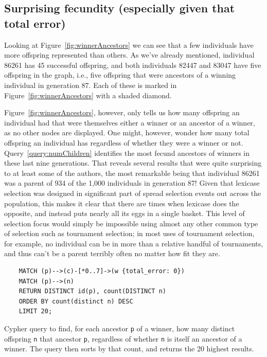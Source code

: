 \subsection{Surprising fecundity (especially given that total error)}
\label{sec:surprisingFecundity}

Looking at Figure~\ref{fig:winnerAncestors} we can see that a few individuals have more offspring
represented than others. As we've already mentioned, individual 86261 has 45 successful offspring,
and both individuals 82447 and 83047 have five offspring in the graph, i.e., five offspring that were
ancestors of a winning individual in generation 87. Each of these is marked in 
Figure~\ref{fig:winnerAncestors} with a shaded diamond.

Figure~\ref{fig:winnerAncestors},
however, only tells us how many offspring an individual had that were themselves either a winner
or an ancestor of a winner, as no other nodes are displayed. One
might, however, wonder how many total offspring an individual has
regardless of whether they were a winner or not. Query~\ref{query:numChildren} identifies the most
fecund ancestors of winners in these last nine generations. That reveals several results that were
quite surprising to at least some of the authors, the most remarkable being that individual 86261 
was a parent of 934 of the 1,000 individuals in generation 87! Given that lexicase selection was
designed in significant part of spread selection events out across the population, this makes it
clear that there are times when lexicase does the opposite, and instead puts nearly all its eggs in
a single basket. This level of selection focus would simply be impossible using almost any other
common type of selection such as tournament selection; in most uses of tournament selection, 
for example, no individual can be in more than a relative handful of tournaments, and thus can't be
a parent terribly often no matter how fit they are.

\begin{Query}
	\begin{verbatim}
	MATCH (p)-->(c)-[*0..7]->(w {total_error: 0}) 
	MATCH (p)-->(n) 
	RETURN DISTINCT id(p), count(DISTINCT n) 
	ORDER BY count(distinct n) DESC
	LIMIT 20;
	\end{verbatim}
	\caption{Cypher query to find, for each ancestor \texttt{p} of a winner, how many distinct offspring 
		\texttt{n} that ancestor \texttt{p}, regardless of whether \texttt{n} is itself an
		ancestor of a winner. The query then sorts by that count, and returns the 20 highest results.}
	\label{query:numChildren}
\end{Query}

